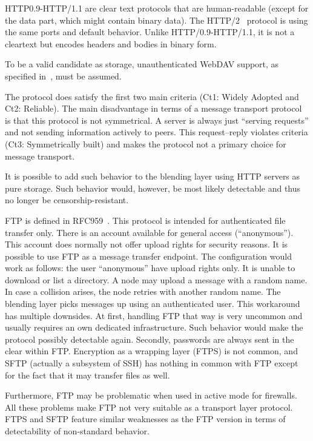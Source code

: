 HTTP0.9-HTTP/1.1 are clear text protocols that are human-readable (except for the data part, which might contain binary data). The HTTP/2~\cite{rfc7540} protocol is using the same ports and default behavior. Unlike HTTP/0.9-HTTP/1.1, it is not a cleartext but encodes headers and bodies in binary form. 

To be a valid candidate as storage, unauthenticated WebDAV support, as specified in~\cite{rfc4918}, must be assumed.

The protocol does satisfy the first two main criteria (Ct1: Widely Adopted and Ct2: Reliable). The main disadvantage in terms of a message transport protocol is that this protocol is not symmetrical. A server is always just ``serving requests'' and not sending information actively to peers. This request--reply violates criteria (Ct3: Symmetrically built) and makes the protocol not a primary choice for message transport. 

It is possible to add such behavior to the blending layer using HTTP servers as pure storage. Such behavior would, however, be most likely detectable and thus no longer be censorship-resistant.

FTP is defined in RFC959~\cite{rfc959}. This protocol is intended for authenticated file transfer only. There is an account available for general access (``anonymous''). This account does normally not offer upload rights for security reasons. It is possible to use FTP as a message transfer endpoint. The configuration would work as follows: the user ``anonymous'' have upload rights only. It is unable to download or list a directory. A node may upload a message with a random name. In case a collision arises, the node retries with another random name. The blending layer picks messages up using an authenticated user. This workaround has multiple downsides. At first, handling FTP that way is very uncommon and usually requires an own dedicated infrastructure. Such behavior would make the protocol possibly detectable again. Secondly, passwords are always sent in the clear within FTP. Encryption as a wrapping layer (FTPS) is not common, and SFTP (actually a subsystem of SSH) has nothing in common with FTP except for the fact that it may transfer files as well.

Furthermore, FTP may be problematic when used in active mode for firewalls. All these problems make FTP not very suitable as a transport layer protocol. FTPS and SFTP feature similar weaknesses as the FTP version in terms of detectability of non-standard behavior.

